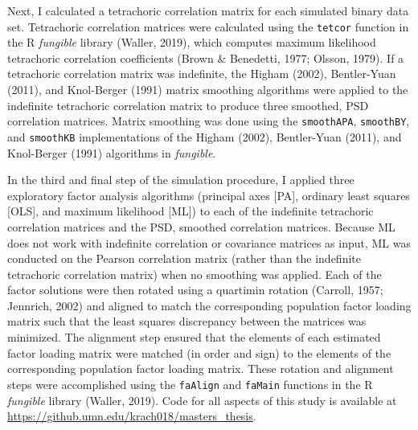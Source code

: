 \documentclass[
  english,
  man]{apa6}
\begin{document}
Next, I calculated a tetrachoric correlation matrix for each simulated binary data set. Tetrachoric correlation matrices were calculated using the \texttt{tetcor} function in the R \emph{fungible} library (Waller, 2019), which computes maximum likelihood tetrachoric correlation coefficients (Brown \& Benedetti, 1977; Olsson, 1979). If a tetrachoric correlation matrix was indefinite, the Higham (2002), Bentler-Yuan (2011), and Knol-Berger (1991) matrix smoothing algorithms were applied to the indefinite tetrachoric correlation matrix to produce three smoothed, PSD correlation matrices. Matrix smoothing was done using the \texttt{smoothAPA}, \texttt{smoothBY}, and \texttt{smoothKB} implementations of the Higham (2002), Bentler-Yuan (2011), and Knol-Berger (1991) algorithms in \emph{fungible}.

In the third and final step of the simulation procedure, I applied three exploratory factor analysis algorithms (principal axes {[}PA{]}, ordinary least squares {[}OLS{]}, and maximum likelihood {[}ML{]}) to each of the indefinite tetrachoric correlation matrices and the PSD, smoothed correlation matrices. Because ML does not work with indefinite correlation or covariance matrices as input, ML was conducted on the Pearson correlation matrix (rather than the indefinite tetrachoric correlation matrix) when no smoothing was applied. Each of the factor solutions were then rotated using a quartimin rotation (Carroll, 1957; Jennrich, 2002) and aligned to match the corresponding population factor loading matrix such that the least squares discrepancy between the matrices was minimized. The alignment step ensured that the elements of each estimated factor loading matrix were matched (in order and sign) to the elements of the corresponding population factor loading matrix. These rotation and alignment steps were accomplished using the \texttt{faAlign} and \texttt{faMain} functions in the R \emph{fungible} library (Waller, 2019). Code for all aspects of this study is available at \url{https://github.umn.edu/krach018/masters_thesis}.
\end{document}
